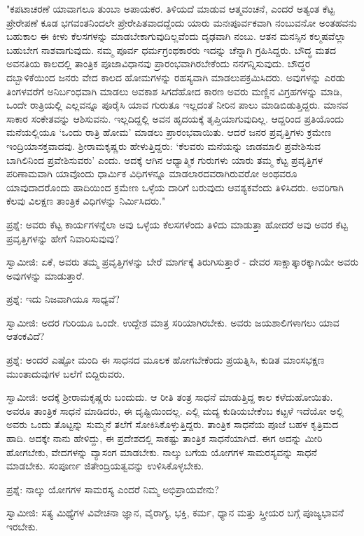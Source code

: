 "ಕಪಟಾಚರಣೆ ಯಾವಾಗಲೂ ತುಂಬಾ ಅಪಾಯಕರ. ತಿಳಿಯದೆ ಮಾಡುವ ಆತ್ಮವಂಚನೆ, ಎಂದರೆ ಅತ್ಯಂತ ಕೆಟ್ಟ ಪ್ರೇರೇಪಣೆ ಕೂಡ ಭಗವಂತನಿಂದಲೇ ಪ್ರೇರೇಪಿತವಾದದ್ದೆಂದು ಯಾರು ಮನಃಪೂರ್ವಕವಾಗಿ ನಂಬುವನೋ ಅಂತಹವನು ಬಹುಕಾಲ ಈ ಕೀಳು ಕೆಲಸಗಳನ್ನು ಮಾಡಬೇಕಾಗುವುದಿಲ್ಲವೆಂದು ದೃಢವಾಗಿ ನಂಬು. ಆತನ ಮನಸ್ಸಿನ ಕಲ್ಮಷವೆಲ್ಲಾ ಬಹುಬೇಗ ನಾಶವಾಗುವುದು. ನಮ್ಮ ಪೂರ್ವ ಧರ್ಮಗ್ರಂಥಕಾರರು ಇದನ್ನು ಚೆನ್ನಾಗಿ ಗ್ರಹಿಸಿದ್ದರು. ಬೌದ್ಧ ಮತದ ಅವನತಿಯ ಕಾಲದಲ್ಲಿ ತಾಂತ್ರಿಕ ಪೂಜಾವಿಧಾನವು ಪ್ರಾರಂಭವಾಗಿರಬೇಕೆಂದು ನನಗನ್ನಿಸುವುದು. ಬೌದ್ಧರ ದಬ್ಬಾಳಿಕೆಯಿಂದ ಜನರು ವೇದ ಕಾಲದ ಹೋಮಗಳನ್ನು ರಹಸ್ಯವಾಗಿ ಮಾಡಲುಪಕ್ರಮಿಸಿದರು. ಅವುಗಳನ್ನು ಎರಡು ತಿಂಗಳವರೆಗೆ ಅನಿರ್ಬಂಧವಾಗಿ ಮಾಡಲು ಅವಕಾಶ ಸಿಗದೆಹೋದ ಕಾರಣ ಅವರು ಮಣ್ಣಿನ ವಿಗ್ರಹಗಳನ್ನು ಮಾಡಿ, ಒಂದೇ ರಾತ್ರಿಯಲ್ಲಿ ಎಲ್ಲವನ್ನೂ ಪೂರೈಸಿ ಯಾವ ಗುರುತೂ ಇಲ್ಲದಂತೆ ನೀರಿನ ಪಾಲು ಮಾಡಿಬಿಡುತ್ತಿದ್ದರು. ಮಾನವ ಸಾಕಾರ ಸಂಕೇತವನ್ನು ಆಶಿಸುವನು. ಇಲ್ಲದಿದ್ದಲ್ಲಿ ಅವನ ಹೃದಯಕ್ಕೆ ತೃಪ್ತಿಯಾಗುವುದಿಲ್ಲ. ಆದ್ದರಿಂದ ಪ್ರತಿಯೊಂದು ಮನೆಯಲ್ಲಿಯೂ ‘ಒಂದು ರಾತ್ರಿ ಹೋಮ’ ಮಾಡಲು ಪ್ರಾರಂಭವಾಯಿತು. ಆದರೆ ಜನರ ಪ್ರವೃತ್ತಿಗಳು ಕ್ರಮೇಣ ಇಂದ್ರಿಯಾಸಕ್ತವಾದವು. ಶ‍್ರೀರಾಮಕೃಷ್ಣರು ಹೇಳುತ್ತಿದ್ದರು: ‘ಕೆಲವರು ಮನೆಯನ್ನು ಜಾಡಮಾಲಿ ಪ್ರವೇಶಿಸುವ ಬಾಗಿಲಿನಿಂದ ಪ್ರವೇಶಿಸುವರು’ ಎಂದು. ಅದಕ್ಕೆ ಆಗಿನ ಆಧ್ಯಾತ್ಮಿಕ ಗುರುಗಳು ಯಾರು ತಮ್ಮ ಕೆಟ್ಟ ಪ್ರವೃತ್ತಿಗಳ ಪರಿಣಾಮವಾಗಿ ಯಾವೊಂದು ಧಾರ್ಮಿಕ ವಿಧಿಗಳನ್ನೂ ಮಾಡಲಾರದವರಾಗಿರುವರೋ ಅಂಥವರೂ ಯಾವುದಾದರೊಂದು ಹಾದಿಯಿಂದ ಕ್ರಮೇಣ ಒಳ್ಳೆಯ ದಾರಿಗೆ ಬರುವುದು ಆವಶ್ಯಕವೆಂದು ತಿಳಿಸಿದರು. ಅವರಿಗಾಗಿ ಕೆಲವು ವಿಲಕ್ಷಣ ತಾಂತ್ರಿಕ ವಿಧಿಗಳನ್ನು ನಿರ್ಮಿಸಿದರು."

ಪ್ರಶ್ನೆ: ಅವರು ಕೆಟ್ಟ ಕಾರ್ಯಗಳನ್ನೆಲಾ ಅವು ಒಳ್ಳೆಯ ಕೆಲಸಗಳೆಂದು ತಿಳಿದು ಮಾಡುತ್ತಾ ಹೋದರೆ ಅವು ಅವರ ಕೆಟ್ಟ ಪ್ರವೃತ್ತಿಗಳನ್ನು ಹೇಗೆ ನಿವಾರಿಸುವುವು?

ಸ್ವಾಮೀಜಿ: ಏಕೆ, ಅವರು ತಮ್ಮ ಪ್ರವೃತ್ತಿಗಳನ್ನು ಬೇರೆ ಮಾರ್ಗಕ್ಕೆ ತಿರುಗಿಸುತ್ತಾರೆ - ದೇವರ ಸಾಕ್ಷಾತ್ಕಾರಕ್ಕಾಗಿಯೇ ಅವರು ಅವುಗಳನ್ನು ಮಾಡುತ್ತಾರೆ.

ಪ್ರಶ್ನೆ: ಇದು ನಿಜವಾಗಿಯೂ ಸಾಧ್ಯವೆ?

ಸ್ವಾಮೀಜಿ: ಅದರ ಗುರಿಯೂ ಒಂದೇ. ಉದ್ದೇಶ ಮಾತ್ರ ಸರಿಯಾಗಿರಬೇಕು. ಅವರು ಜಯಶಾಲಿಗಳಾಗಲು ಯಾವ ಆತಂಕವಿದೆ?

ಪ್ರಶ್ನೆ: ಅಂದರೆ ಎಷ್ಟೋ ಮಂದಿ ಈ ಸಾಧನದ ಮೂಲಕ ಹೋಗಬೇಕೆಂದು ಪ್ರಯತ್ನಿಸಿ, ಕುಡಿತ ಮಾಂಸಭಕ್ಷಣ ಮುಂತಾದುವುಗಳ ಬಲೆಗೆ ಬಿದ್ದಿರುವರು.

ಸ್ವಾಮೀಜಿ: ಅದಕ್ಕೆ ಶ‍್ರೀರಾಮಕೃಷ್ಣರು ಬಂದುದು. ಆ ರೀತಿ ತಂತ್ರ ಸಾಧನೆ ಮಾಡುತ್ತಿದ್ದ ಕಾಲ ಕಳೆದುಹೋಯಿತು. ಅವರೂ ತಾಂತ್ರಿಕ ಸಾಧನೆ ಮಾಡಿದರು, ಈ ದೃಷ್ಟಿಯಿಂದಲ್ಲ. ಎಲ್ಲಿ ಮದ್ಯ ಕುಡಿಯಬೇಕೆಂಬ ಕಟ್ಟಳೆ ಇದೆಯೋ ಅಲ್ಲಿ ಅವರು ಒಂದು ತೊಟ್ಟನ್ನು ಸುಮ್ಮನೆ ತಲೆಗೆ ಸೋಕಿಸಿಕೊಳ್ಳುತ್ತಿದ್ದರು. ತಾಂತ್ರಿಕ ಸಾಧನೆಯ ಪೂಜೆ ಬಹಳ ಕೃತ್ರಿಮದ ಹಾದಿ. ಅದಕ್ಕೇ ನಾನು ಹೇಳಿದ್ದು, ಈ ಪ್ರದೇಶದಲ್ಲಿ ಸಾಕಷ್ಟು ತಾಂತ್ರಿಕ ಸಾಧನೆಯಾಗಿದೆ. ಈಗ ಅದನ್ನು ಮೀರಿ ಹೋಗಬೇಕು, ವೇದಗಳನ್ನು ವ್ಯಾಸಂಗ ಮಾಡಬೇಕು. ನಾಲ್ಕು ಬಗೆಯ ಯೋಗಗಳ ಸಾಮರಸ್ಯವನ್ನು ಸಾಧನೆ ಮಾಡಬೇಕು. ಸಂಪೂರ್ಣ ಜಿತೇಂದ್ರಿಯತ್ವವನ್ನು ಉಳಿಸಿಕೊಳ್ಳಬೇಕು.

ಪ್ರಶ್ನೆ: ನಾಲ್ಕು ಯೋಗಗಳ ಸಾಮರಸ್ಯ ಎಂದರೆ ನಿಮ್ಮ ಅಭಿಪ್ರಾಯವೇನು?

ಸ್ವಾಮೀಜಿ: ಸತ್ಯ ಮಿಥ್ಯೆಗಳ ವಿವೇಚನಾ ಜ್ಞಾನ, ವೈರಾಗ್ಯ, ಭಕ್ತಿ, ಕರ್ಮ, ಧ್ಯಾನ ಮತ್ತು ಸ್ತ್ರೀಯರ ಬಗ್ಗೆ ಪೂಜ್ಯಭಾವನೆ ಇರಬೇಕು.

